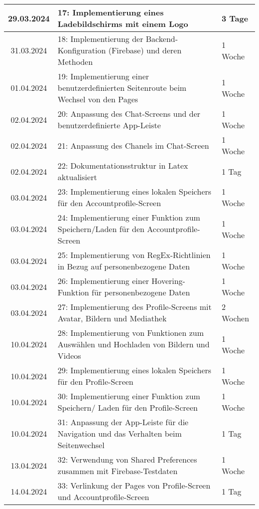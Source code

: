 \begin{table}[h]
{\begin{tabular}{|c|l|l|}
		\hline
        {29.03.2024} & {17: Implementierung eines Ladebildschirms mit einem Logo} & {3 Tage} \\
		\hline
        {31.03.2024} & {18: Implementierung der Backend-Konfiguration (Firebase) und deren Methoden} & {1 Woche} \\
		\hline
        {01.04.2024} & {19: Implementierung einer benutzerdefinierten Seitenroute beim Wechsel von den Pages} & {1 Woche} \\
		\hline
        {02.04.2024} & {20: Anpassung des Chat-Screens und der benutzerdefinierte App-Leiste} & {1 Woche} \\
		\hline
        {02.04.2024} & {21: Anpassung des Chanels im Chat-Screen} & {1 Woche} \\
		\hline
        {02.04.2024} & {22: Dokumentationsstruktur in Latex aktualisiert} & {1 Tag} \\
		\hline
        {03.04.2024} & {23: Implementierung eines lokalen Speichers für den Accountprofile-Screen} & {1 Woche} \\
		\hline
        {03.04.2024} & {24: Implementierung einer Funktion zum Speichern/Laden für den Accountprofile-Screen} & {1 Woche} \\
		\hline
        {03.04.2024} & {25: Implementierung von RegEx-Richtlinien in Bezug auf personenbezogene Daten} & {1 Woche} \\
		\hline
        {03.04.2024} & {26: Implementierung einer Hovering-Funktion für personenbezogene Daten} & {1 Woche} \\
		\hline
        {03.04.2024} & {27: Implementierung des Profile-Screens mit Avatar, Bildern und Mediathek} & {2 Wochen} \\
		\hline
        {10.04.2024} & {28: Implementierung von Funktionen zum Auswählen und Hochladen von Bildern und Videos} & {1 Woche} \\
		\hline
        {10.04.2024} & {29: Implementierung eines lokalen Speichers für den Profile-Screen} & {1 Woche} \\
		\hline
        {10.04.2024} & {30: Implementierung einer Funktion zum Speichern/ Laden für den Profile-Screen} & {1 Woche} \\
		\hline
        {10.04.2024} & {31: Anpassung der App-Leiste für die Navigation und das Verhalten beim Seitenwechsel} & {1 Tag} \\
		\hline
        {13.04.2024} & {32: Verwendung von Shared Preferences zusammen mit Firebase-Testdaten} & {1 Woche} \\
		\hline
        {14.04.2024} & {33: Verlinkung der Pages von Profile-Screen und Accountprofile-Screen} & {1 Tag} \\

\end{tabular}}
\end{table}
